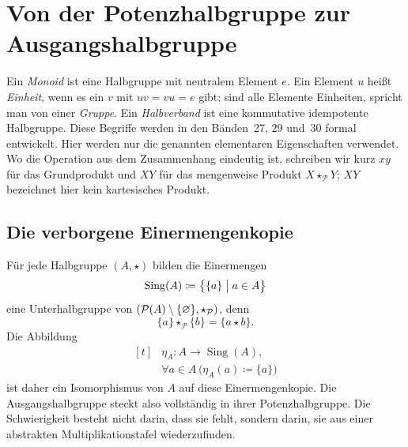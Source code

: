 \documentclass[main.tex]{subfiles}
\begin{document}
\chapter{Von der Potenzhalbgruppe zur Ausgangshalbgruppe}

\begin{remark}
Ein \emph{Monoid} ist eine Halbgruppe mit neutralem Element \(e\).  Ein
Element \(u\) heißt \emph{Einheit}, wenn es ein \(v\) mit
\(uv=vu=e\) gibt; sind alle Elemente Einheiten, spricht man von einer
\emph{Gruppe}.  Ein \emph{Halbverband} ist eine kommutative idempotente
Halbgruppe.  Diese Begriffe werden in den Bänden~27, 29 und~30 formal
entwickelt.  Hier werden nur die genannten elementaren Eigenschaften
verwendet.  Wo die Operation aus dem Zusammenhang eindeutig ist, schreiben
wir kurz \(xy\) für das Grundprodukt und \(XY\) für das mengenweise Produkt
\(X\star_{\mathcal P}Y\); \(XY\) bezeichnet hier kein kartesisches Produkt.
\end{remark}

\section{Die verborgene Einermengenkopie}

Für jede Halbgruppe \((A,\star)\) bilden die Einermengen
\[
  \operatorname{Sing}(A)
  \coloneqq
  \bigl\{\{a\}\bigm|a\in A\bigr\}
\]
eine Unterhalbgruppe von \((\mathcal{P}(A)\setminus\{\varnothing\},\star_{\mathcal P})\), denn
\[
  \{a\}\star_{\mathcal P}\{b\}=\{a\star b\}.
\]
Die Abbildung
\[
  \begin{aligned}[t]
    &\eta_A\colon A\to\operatorname{Sing}(A),\\[-2pt]
    &\forall a\in A\,\bigl(\eta_A(a)\coloneqq\{a\}\bigr)
  \end{aligned}
\]
ist daher ein Isomorphismus von \(A\) auf diese Einermengenkopie.  Die
Ausgangshalbgruppe steckt also vollständig in ihrer Potenzhalbgruppe.  Die
Schwierigkeit besteht nicht darin, dass sie fehlt, sondern darin, sie aus
einer abstrakten Multiplikationstafel wiederzufinden.
\end{document}
